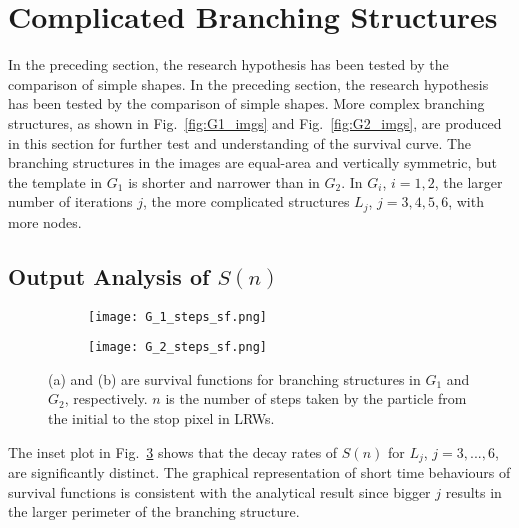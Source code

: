 \section{Complicated Branching Structures}


In the preceding section, the research hypothesis has been tested by
the comparison of simple shapes. In the preceding section, the
research hypothesis has been tested by the comparison of simple
shapes. More complex branching structures, as shown in
Fig.~\ref{fig:G1_imgs} and Fig.~\ref{fig:G2_imgs}, are produced in
this section for further test and understanding of the survival
curve. The branching structures in the images are equal-area and
vertically symmetric, but the template in $G_1$ is shorter and
narrower than in $G_2$. In $G_i$, $i=1, 2$, the larger number of
iterations $j$, the more complicated structures $L_j$, $j=3, 4, 5, 6$,
with more nodes.




\subsection{Output Analysis of $S(n)$}

    
       \begin{figure}
        \centering
        
        \begin{subfigure}[b]{0.45\textwidth}
          \texttt{[image: G\_1\_steps\_sf.png]}
          \caption{}
          \label{fig:sf_g1_branch_steps}
        \end{subfigure}
        \hfill
        \begin{subfigure}[b]{0.45\textwidth}
          \texttt{[image: G\_2\_steps\_sf.png]}
          \caption{}
          \label{fig:sf_g2_branch_steps}
        \end{subfigure}

        \caption{(a) and (b) are survival functions for branching structures in $G_1$ and $G_2$, respectively. $n$ is the number of steps taken by the particle from the initial to the stop pixel in LRWs.}
        \label{fig:sf_branch_steps}

      \end{figure}

       
       The inset plot in Fig.~\ref{fig:sf_branch_steps} shows that the
       decay rates of $S(n)$ for $L_j$, $j=3, ..., 6$, are
       significantly distinct. The graphical representation of short
       time behaviours of survival functions is consistent with the
       analytical result since bigger $j$ results in the larger
       perimeter of the branching structure.


